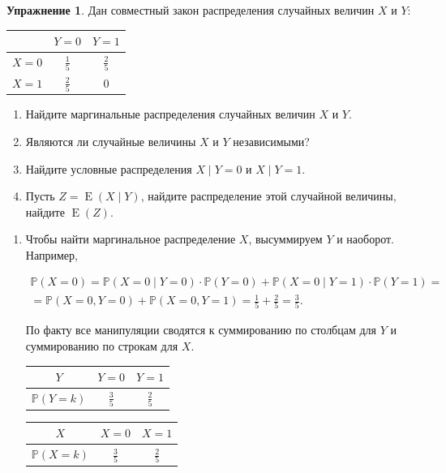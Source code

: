 \documentclass[12pt, a4paper, oneside]{extreport}
\DeclareMathOperator{\E}{\mathop{E}}
\def \mbb{\mathbb}
\def \PP{\mbb{P}}
\theoremstyle{plain}              %
\theoremstyle{definition}         %
\newtheorem{problem}{\color{myblue} Упражнение}
\begin{document}
\begin{problem}
Дан совместный закон распределения случайных величин $X$ и $Y$:	
	\begin{center}
		\begin{tabular}{c|c|c}
			&  $Y = 0$    &  $Y = 1$   \\ \hline
			$X = 0$   & $\frac{1}{5}$     &  $\frac{2}{5}$ \\ \hline
			$X = 1$    & $\frac{2}{5}$    &  $0$ \\
		\end{tabular}
	\end{center}

\begin{enumerate}
\item Найдите маргинальные распределения случайных величин $X$ и $Y$. 
\item Являются ли случайные величины $X$ и $Y$ независимыми? 
\item Найдите условные распределения  $X \mid Y = 0$  и $X \mid Y=1$.
\item Пусть $Z = \E(X \mid Y)$, найдите распределение этой случайной величины, найдите $\E(Z)$.
\end{enumerate} 

\begin{sol}
\begin{enumerate}
	\item  Чтобы найти маргинальное распределение $X$, высуммируем $Y$ и наоборот. Например, 
	
	\begin{multline*}
	\PP(X = 0) = \PP(X = 0 \mid Y =0) \cdot \PP(Y=0) + \PP(X = 0 \mid Y = 1) \cdot \PP(Y = 1) = \\ = \PP(X = 0, Y=0) + \PP(X = 0, Y = 1) = \frac{1}{5} + \frac{2}{5} = \frac{3}{5}.
	\end{multline*}
	
По факту все  манипуляции сводятся к суммированию по столбцам для $Y$ и суммированию по строкам для $X$. 
	
	\begin{minipage}[t]{0.45\textwidth}
		\begin{tabular}{c|c|c}
			$Y$&  $Y = 0$    &  $Y = 1$   \\ \hline
			$\PP(Y=k)$   & $\frac{3}{5}$     &  $\frac{2}{5}$ 
		\end{tabular}
	\end{minipage}
	\begin{minipage}[t]{0.45\textwidth}
		\begin{tabular}{c|c|c}
			$X$&  $X = 0$    &  $X = 1$   \\ \hline
			$\PP(X=k)$   & $\frac{3}{5}$     &  $\frac{2}{5}$ 
		\end{tabular}
	\end{minipage}
	

\end{enumerate}
\end{sol}
\end{problem}
\end{document}
